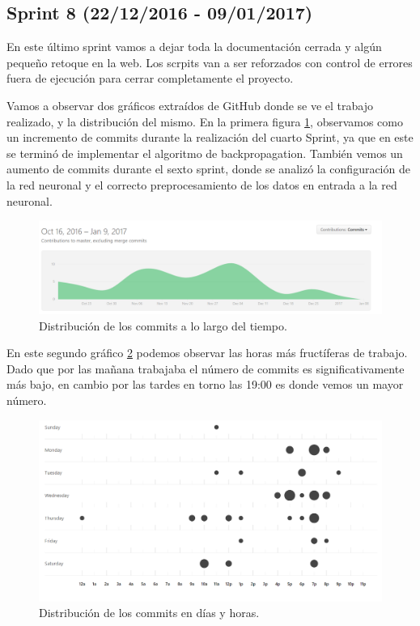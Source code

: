 \subsection{Sprint 8 (22/12/2016 - 09/01/2017)}
En este último sprint vamos a dejar toda la documentación cerrada y algún pequeño retoque en la web.
Los scrpits van a ser reforzados con control de errores fuera de ejecución para cerrar completamente el proyecto.

Vamos a observar dos gráficos extraídos de GitHub donde se ve el trabajo realizado, y la distribución del mismo. En la primera figura \ref{fig:Commits}, observamos como un incremento de commits durante la realización del cuarto Sprint, ya que en este se terminó de implementar el algoritmo de backpropagation. También vemos un aumento de commits durante el sexto sprint, donde se analizó la configuración de la red neuronal y el correcto preprocesamiento de los datos en entrada a la red neuronal.

\begin{figure}
\centering
\includegraphics[width=.9\textwidth]{img/commits}
\caption{Distribución de los commits a lo largo del tiempo.}
\label{fig:Commits}
\end{figure}

En este segundo gráfico \ref{fig:punch_card} podemos observar las horas más fructíferas de trabajo. Dado que por las mañana trabajaba el número de commits es significativamente más bajo, en cambio por las tardes en torno las 19:00 es donde vemos un mayor número.

\begin{figure}
\centering
\includegraphics[width=.9\textwidth]{img/punch_card}
\caption{Distribución de los commits en días y horas.}
\label{fig:punch_card}
\end{figure}
 



